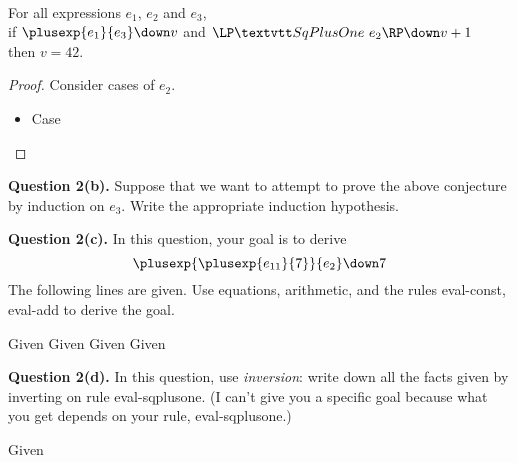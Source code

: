 \begin{conjecture*} ~\\
  For all expressions $e_1$, $e_2$ and $e_3$, \\
  if $\plusexp{e_1}{e_3} \down v$ and $\sqplusoneexp{e_2} \down v + 1$ \\
  then $v = 42$.
\end{conjecture*}
\begin{proof}
  Consider cases of $e_2$.

  \begin{itemize}
  \item Case
  \end{itemize}

\vspace*{10ex}
\end{proof}


\textbf{Question 2(b).}
Suppose that we want to attempt to prove the above conjecture by induction on $e_3$.
Write the appropriate induction hypothesis.


\vspace*{10ex}


\textbf{Question 2(c).}
In this question, your goal is to derive
\[
  \plusexp{\plusexp{e_{11}}{7}}{e_2} \down 7
\]
The following lines are given.  Use equations, arithmetic,
and the rules eval-const, eval-add to derive the goal.

\begin{llproof}
    {Given}
    {Given}
    {Given}
    {Given}
  \Pf{}{}{\hspace*{150pt}}  {}
\end{llproof}

\vspace*{20ex}


\textbf{Question 2(d).}
In this question, use \emph{inversion}: write down all the facts given by inverting
on rule eval-sqplusone.  (I can't give you a specific goal because what you get depends on your rule, eval-sqplusone.)

\begin{llproof}
    {Given}
  \Pf{}{}{\hspace*{150pt}}  {}
~\\
~\\
\end{llproof}



\clearpage

